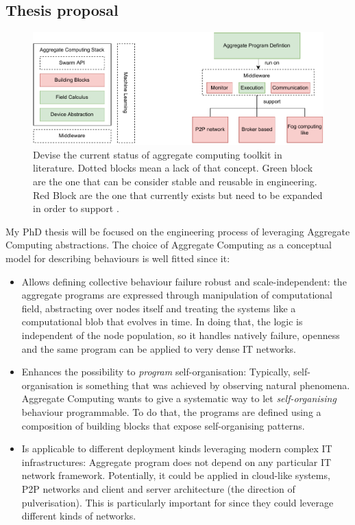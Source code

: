 \documentclass[11pt]{article}
\begin{document}
\subsection{Thesis proposal}
\begin{figure}
	\centering
	\includegraphics[width=\textwidth]{img/to-do-for-thesis.pdf}
	\caption{Devise the current status of aggregate computing toolkit in literature. Dotted blocks mean a lack of that concept. Green block are the one that can be consider stable and reusable in \cpws engineering. Red Block are the one that currently exists but need to be expanded in order to support \cpws.}
	\label{fig:current-state}
\end{figure}
My PhD thesis will be focused on the engineering process of \cpws leveraging Aggregate Computing abstractions. The choice of Aggregate Computing as a conceptual model for describing \cpws behaviours is well fitted since it:
\begin{itemize}
	\item Allows defining collective behaviour failure robust and scale-independent: the aggregate programs are expressed through manipulation of computational field, abstracting over nodes itself and treating the systems like a computational blob that evolves in time. In doing that, the logic is independent of the node population, so it handles natively failure, openness and the same program can be applied to very dense IT networks.
	\item Enhances the possibility to \textit{program} self-organisation: Typically, self-organisation is something that was achieved by observing natural phenomena. Aggregate Computing wants to give a systematic way to let \textit{self-organising} behaviour programmable. To do that, the programs are defined using a composition of building blocks that expose self-organising patterns.
	\item Is applicable to different deployment kinds leveraging modern complex IT infrastructures: Aggregate program does not depend on any particular IT network framework. Potentially, it could be applied in cloud-like systems, P2P networks and client and server architecture (the direction of pulverisation). This is particularly important for \cpws since they could leverage different kinds of networks.
\end{itemize}
\end{document}
